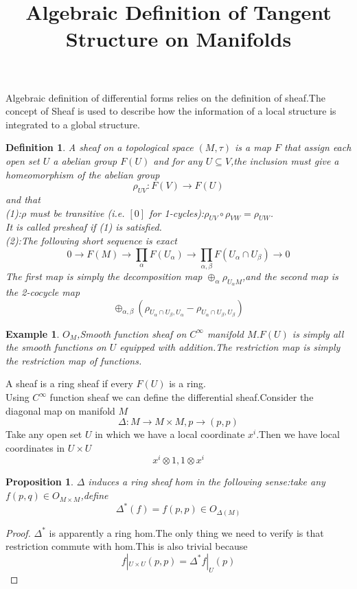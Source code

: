 \documentclass[a4paper,12pt]{article}
\title{Algebraic Definition of Tangent Structure on Manifolds}
\theoremstyle{mystyle}
\theoremstyle{mystyle}
\newtheorem{proposition}{Proposition}
\newtheorem{definition}{\color{blue} Definition}
\newtheorem{example}{Example}
\numberwithin{equation}{section}
\begin{document}
	\maketitle
	Algebraic definition of differential forms relies on the definition of sheaf.The concept of Sheaf is used to describe how the information of a local structure is integrated to a global structure.
	\begin{definition}
		A sheaf on a topological space $(M,\tau)$ is a map $F$ that assign each open set $U$ a abelian group $F(U)$ and for any $U\subseteq V$,the inclusion must give a homeomorphism of the abelian group
		$$\rho_{UV}:F(V)\to F(U)$$
		and that
		\\
		(1):$\rho$ must be transitive (i.e. $[0]$ for 1-cycles):$\rho_{UV}\circ \rho_{VW}=\rho_{UW}$.
		\\
		It is called presheaf if (1) is satisfied.
		\\
		(2):The following short sequence is exact
		$$0\to F(M)\to \prod_{\alpha} F(U_{\alpha})\to \prod_{\alpha,\beta} F(U_{\alpha}\cap U_\beta)\to 0$$
		The first map is simply the decomposition map $\oplus_{\alpha} \rho_{U_\alpha M}$,and the second map is the 2-cocycle map
		$$\oplus_{\alpha,\beta}(\rho_{U_\alpha\cap U_\beta,U_\alpha}-\rho_{U_\alpha\cap U_\beta,U_\beta})$$
	\end{definition}
	\begin{example}
		$O_M$,Smooth function sheaf on $C^\infty$ manifold $M$.$F(U)$ is simply all the smooth functions on $U$ equipped with addition.The restriction map is simply the restriction map of functions.
	\end{example}
	A sheaf is a ring sheaf if every $F(U)$ is a ring.
	\\ 
	Using $C^\infty$ function sheaf we can define the differential sheaf.Consider the diagonal map on manifold $M$
	$$\Delta:M\to M\times M,p\to (p,p)$$
	Take any open set $U$ in which we have a local coordinate $x^i$.Then we have local coordinates in $U\times U$
	$$x^i\otimes 1,1\otimes x^i$$
	\begin{proposition}
		$\Delta$ induces a ring sheaf hom in the following sense:take any $f(p,q)\in O_{M\times M}$,define 
		$$\Delta^*(f)=f(p,p)\in O_{\Delta(M)}$$
	\end{proposition}
	\begin{proof}
		$\Delta^*$ is apparently a ring hom.The only thing we need to verify is that restriction commute with hom.This is also trivial because
		$$f|_{U\times U}(p,p)=\Delta^*f|_U(p)$$
	\end{proof}
\end{document}
